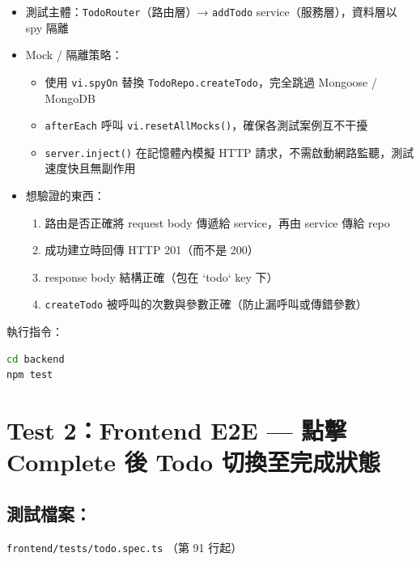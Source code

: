 \documentclass[11pt,a4paper]{article}
\begin{document}
\begin{itemize}

\item 測試主體：\texttt{TodoRouter}（路由層）→ \texttt{addTodo} service（服務層），資料層以 spy 隔離

\item Mock / 隔離策略：
    \begin{itemize}
        \item 使用 \texttt{vi.spyOn} 替換 \texttt{TodoRepo.createTodo}，完全跳過 Mongoose / MongoDB
        \item \texttt{afterEach} 呼叫 \texttt{vi.resetAllMocks()}，確保各測試案例互不干擾
        \item \texttt{server.inject()} 在記憶體內模擬 HTTP 請求，不需啟動網路監聽，測試速度快且無副作用
    \end{itemize}

\item 想驗證的東西：
    \begin{enumerate}
        \item 路由是否正確將 request body 傳遞給 service，再由 service 傳給 repo
        \item 成功建立時回傳 HTTP 201（而不是 200）
        \item response body 結構正確（包在 `todo` key 下）
        \item \texttt{createTodo} 被呼叫的次數與參數正確（防止漏呼叫或傳錯參數）
    \end{enumerate}
\end{itemize}

執行指令：
\begin{lstlisting}[language=Bash]
cd backend
npm test
\end{lstlisting}




\section*{Test 2：Frontend E2E — 點擊 Complete 後 Todo 切換至完成狀態}

\subsection*{測試檔案：} 
\texttt{frontend/tests/todo.spec.ts} （第 91 行起）
\end{document}
